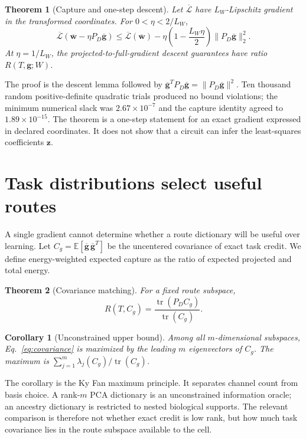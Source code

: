 \documentclass[11pt]{article}
\newtheorem{theorem}{Theorem}
\newtheorem{corollary}{Corollary}
\newcommand{\E}{\mathbb E}
\DeclareMathOperator{\tr}{tr}
\begin{document}
\begin{theorem}[Capture and one-step descent]
Let $\overline{\mathcal L}$ have $L_W$-Lipschitz gradient in the transformed
coordinates. For $0<\eta<2/L_W$,
\begin{equation}
\overline{\mathcal L}(\overline{\bm w}-\eta P_D\overline{\bm g})
\leq \overline{\mathcal L}(\overline{\bm w})-
\eta\left(1-\frac{L_W\eta}{2}\right)
\lVert P_D\overline{\bm g}\rVert_2^2.
\label{eq:descent}
\end{equation}
At $\eta=1/L_W$, the projected-to-full-gradient descent guarantees have ratio
$R(T,\bm g;W)$.
\end{theorem}

The proof is the descent lemma followed by
$\overline{\bm g}^{T}P_D\overline{\bm g}=\lVert P_D\overline{\bm g}\rVert^2$.
Ten thousand random positive-definite quadratic trials produced no bound
violations; the minimum numerical slack was $2.67\times10^{-7}$ and the capture
identity agreed to $1.89\times10^{-15}$. The theorem is a one-step statement
for an exact gradient expressed in declared coordinates. It does not show that
a circuit can infer the least-squares coefficients $\bm z$.

\section{Task distributions select useful routes}

A single gradient cannot determine whether a route dictionary will be useful
over learning. Let
$C_g=\E[\overline{\bm g}\,\overline{\bm g}^{T}]$ be the uncentered covariance
of exact task credit. We define energy-weighted expected capture as the ratio
of expected projected and total energy.

\begin{theorem}[Covariance matching]
For a fixed route subspace,
\begin{equation}
R(T,C_g)=\frac{\tr(P_D C_g)}{\tr(C_g)}.
\label{eq:covariance}
\end{equation}
\end{theorem}

\begin{corollary}[Unconstrained upper bound]
Among all $m$-dimensional subspaces, Eq.~\ref{eq:covariance} is maximized by the
leading $m$ eigenvectors of $C_g$. The maximum is
$\sum_{j=1}^{m}\lambda_j(C_g)/\tr(C_g)$.
\end{corollary}

The corollary is the Ky Fan maximum principle. It separates channel count from
basis choice. A rank-$m$ PCA dictionary is an unconstrained information oracle;
an ancestry dictionary is restricted to nested biological supports. The
relevant comparison is therefore not whether exact credit is low rank, but how
much task covariance lies in the route subspace available to the cell.
\end{document}

